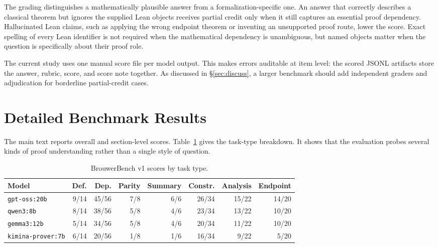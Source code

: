 \documentclass{article}
\theoremstyle{definition}
\begin{document}
The grading distinguishes a mathematically plausible answer from a formalization-specific one. An answer that correctly describes a classical theorem but ignores the supplied Lean objects receives partial credit only when it still captures an essential proof dependency. Hallucinated Lean claims, such as applying the wrong endpoint theorem or inventing an unsupported proof route, lower the score. Exact spelling of every Lean identifier is not required when the mathematical dependency is unambiguous, but named objects matter when the question is specifically about their proof role.

The current study uses one manual score file per model output. This makes errors auditable at item level: the scored JSONL artifacts store the answer, rubric, score, and score note together. As discussed in \S\ref{sec:discuss}, a larger benchmark should add independent graders and adjudication for borderline partial-credit cases.

\section{Detailed Benchmark Results}
\label{app:results}

The main text reports overall and section-level scores. Table~\ref{tab:appendix-results-by-type} gives the task-type breakdown. It shows that the evaluation probes several kinds of proof understanding rather than a single style of question.

\begin{table}[H]
\caption{BrouwerBench v1 scores by task type.}
\label{tab:appendix-results-by-type}
\begin{center}
    \begin{small}
      \begin{tabular}{lrrrrrrr}
\toprule
Model & Def. & Dep. & Parity & Summary & Constr. & Analysis & Endpoint \\
\midrule
\texttt{gpt-oss:20b} & 9/14 & 45/56 & 7/8 & 6/6 & 26/34 & 15/22 & 14/20 \\
\texttt{qwen3:8b} & 8/14 & 38/56 & 5/8 & 4/6 & 23/34 & 13/22 & 10/20 \\
\texttt{gemma3:12b} & 5/14 & 34/56 & 5/8 & 4/6 & 20/34 & 11/22 & 10/20 \\
\texttt{kimina-prover:7b} & 6/14 & 20/56 & 1/8 & 1/6 & 16/34 & 9/22 & 5/20 \\
\bottomrule
\end{tabular}
    \end{small}
  \end{center}
  \vskip -0.1in
\end{table}
\end{document}
